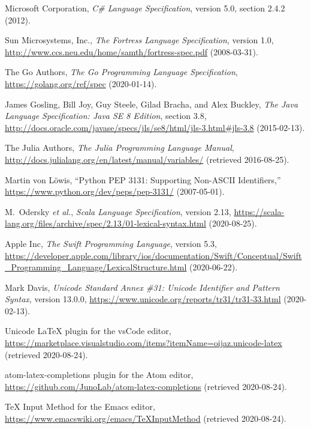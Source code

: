 \documentclass[10pt,english]{article}
\begin{document}
\begin{thebibliography}{10}

Microsoft Corporation, \emph{C\# Language Specification},
version 5.0, section 2.4.2 (2012).

Sun Microsystems, Inc., \emph{The Fortress Language
Specification}, version 1.0, \url{http://www.ccs.neu.edu/home/samth/fortress-spec.pdf}
(2008-03-31).

The Go Authors, \emph{The Go Programming Language Specification},
\url{https://golang.org/ref/spec} (2020-01-14).

James Gosling, Bill Joy, Guy Steele, Gilad Bracha,
and Alex Buckley, \emph{The Java Language Specification: Java SE 8
Edition}, section 3.8, \url{http://docs.oracle.com/javase/specs/jls/se8/html/jls-3.html\#jls-3.8}
(2015-02-13).

The Julia Authors, \emph{The Julia Programming Language
Manual}, \url{http://docs.julialang.org/en/latest/manual/variables/}
(retrieved 2016-08-25).

Martin von L{\"o}wis, ``Python PEP 3131:
Supporting Non-ASCII Identifiers,'' \url{https://www.python.org/dev/peps/pep-3131/}
(2007-05-01).

M.~Odersky \textit{et al.}, \emph{Scala Language Specification},
version 2.13, \url{https://scala-lang.org/files/archive/spec/2.13/01-lexical-syntax.html}
(2020-08-25).

Apple Inc, \emph{The Swift Programming Language},
version 5.3, \url{https://developer.apple.com/library/ios/documentation/Swift/Conceptual/Swift_Programming_Language/LexicalStructure.html}
(2020-06-22).

Mark Davis, \emph{Unicode Standard Annex \#31: Unicode
Identifier and Pattern Syntax}, version 13.0.0, \url{https://www.unicode.org/reports/tr31/tr31-33.html}
(2020-02-13).

Unicode LaTeX plugin for the vsCode editor,
\url{https://marketplace.visualstudio.com/items?itemName=oijaz.unicode-latex}
(retrieved 2020-08-24).

atom-latex-completions plugin for the Atom editor,
\url{https://github.com/JunoLab/atom-latex-completions}
(retrieved 2020-08-24).

\TeX{} Input Method for the Emacs editor, \url{https://www.emacswiki.org/emacs/TeXInputMethod}
(retrieved 2020-08-24).


\end{thebibliography}
\end{document}
